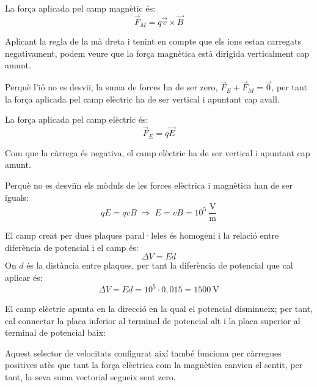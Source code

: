 \begin{solapartat}

 La força aplicada pel camp magnètic és:
\[ \vec{F}_M = q\vec{v}\times\vec{B} \]

 Aplicant la regla de la mà dreta i tenint en compte que els ions estan carregats negativament, podem veure que la força magnètica està dirigida verticalment cap amunt.

 Perquè l'ió no es desviï, la suma de forces ha de ser zero, $\vec{F}_E + \vec{F}_M = \vec{0}$, per tant la força aplicada pel camp elèctric ha de ser vertical i apuntant cap avall.

 La força aplicada pel camp elèctric és:
\[ \vec{F}_E = q\vec{E} \]

 Com que la càrrega és negativa, el camp elèctric ha de ser vertical i apuntant cap amunt.

 Perquè no es desviïn els mòduls de les forces elèctrica i magnètica han de ser iguals:
\[ qE = qvB \;\Rightarrow\; E = vB = 10^{5}\ \frac{\mathrm{V}}{\mathrm{m}} \]

 El camp creat per dues plaques paral·leles és homogeni i la relació entre diferència de potencial i el camp és:
\[ \Delta V = Ed \]
On $d$ és la distància entre plaques, per tant la diferència de potencial que cal aplicar és:
\[ \Delta V = Ed = 10^{5}\cdot 0,015 = 1500\ \mathrm{V} \]

 El camp elèctric apunta en la direcció en la qual el potencial disminueix; per tant, cal connectar la placa inferior al terminal de potencial alt i la placa superior al terminal de potencial baix:

\noindent\begin{minipage}[c]{0.62\linewidth}
\end{minipage}\hfill
\begin{minipage}[c]{0.3\linewidth}
\end{minipage}

 Aquest selector de velocitats configurat així també funciona per càrregues positives atès que tant la força elèctrica com la magnètica canvien el sentit, per tant, la seva suma vectorial segueix sent zero.
\end{solapartat}

